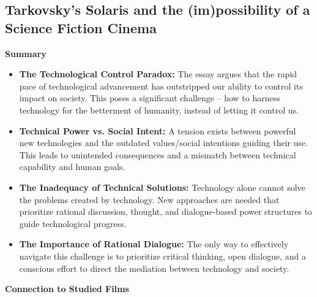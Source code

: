 \documentclass[11pt,fleqn]{book}
\begin{document}
\subsection{Tarkovsky’s Solaris and the (im)possibility of a Science Fiction Cinema}
\textbf{Summary}

\begin{itemize}
\item \textbf{The Technological Control Paradox:} The essay argues that the rapid pace of technological advancement has outstripped our ability to control its impact on society. This poses a significant challenge – how to harness technology for the betterment of humanity, instead of letting it control us. 

\item \textbf{Technical Power vs. Social Intent:}  A tension exists between powerful new technologies and the outdated values/social intentions guiding their use. This leads to unintended consequences and a mismatch between technical capability and human goals.

\item \textbf{The Inadequacy of Technical Solutions:} Technology alone cannot solve the problems created by technology. New approaches are needed that prioritize rational discussion, thought, and dialogue-based power structures to guide technological progress.

\item \textbf{The Importance of Rational Dialogue:} The only way to effectively navigate this challenge is to prioritize critical thinking, open dialogue, and a conscious effort to direct the mediation between technology and society.
\end{itemize}
\vspace{5pt}
\textbf{Connection to Studied Films}
\end{document}
